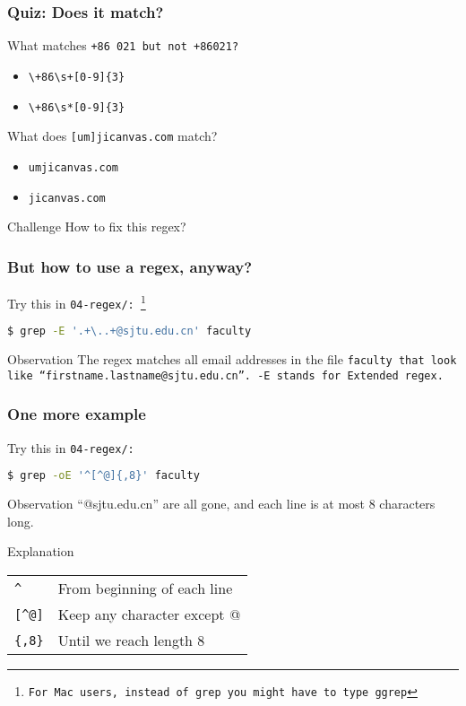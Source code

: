 \begin{frame}[fragile]
\frametitle{Quiz: Does it match?}
What matches \tt{+86 021} but not \tt{+86021}?
\begin{itemize}
    \item \verb|\+86\s+[0-9]{3}| %
    \item \verb|\+86\s*[0-9]{3}|
\end{itemize}

What does \Large \verb|[um]jicanvas.com| \normalsize match?
\begin{itemize}
    \item \tt{umjicanvas.com}
    \item \tt{jicanvas.com} %
\end{itemize}

\begin{block}{Challenge}
    How to fix this regex? %
\end{block}
\end{frame}

\begin{frame}[fragile]
\frametitle{But how to use a regex, anyway?}
Try this in \tt{04-regex/}:
\footnote{For Mac users, instead of \tt{grep} you might have to type \tt{ggrep}}
\begin{lstlisting}[language=bash]
$ grep -E '.+\..+@sjtu.edu.cn' faculty
\end{lstlisting}
\pause
\begin{block}{Observation}
    The regex matches all email addresses in the file \tt{faculty}
    that look like ``firstname.lastname@sjtu.edu.cn''.
    \newline \newline
    \tt{-E} stands for Extended regex.
\end{block}
\end{frame}

\begin{frame}[fragile]
\frametitle{One more example}
Try this in \tt{04-regex/}:
\begin{lstlisting}[language=bash]
$ grep -oE '^[^@]{,8}' faculty
\end{lstlisting}
\pause
\begin{block}{Observation}
    ``@sjtu.edu.cn'' are all gone, and each line is at most 8 characters long.
\end{block}
\begin{block}{Explanation}
    \begin{tabular}{ll}
        \verb|^|    & From beginning of each line \\
        \verb|[^@]| & Keep any character except @ \\
        \verb|{,8}| & Until we reach length 8
    \end{tabular}
\end{block}
\end{frame}

